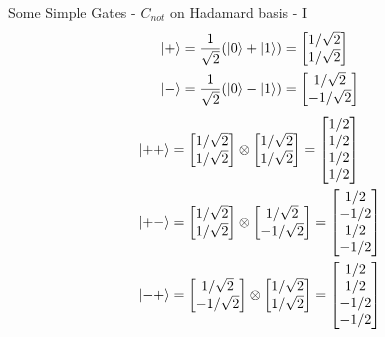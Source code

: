 \documentclass{beamer}
\begin{document}
\begin{frame}{Some Simple Gates - $C_{not}$ on Hadamard basis - I}
  {\tiny
    \begin{align*}
      \ket{+} &= \frac{1}{\sqrt{2}} (\ket{0} + \ket{1}) = \begin{bmatrix} 1 / \sqrt{2} \\ 1 / \sqrt{2} \end{bmatrix} \\
      \ket{-} &= \frac{1}{\sqrt{2}} (\ket{0} - \ket{1})  = \begin{bmatrix} 1 / \sqrt{2} \\ - 1 / \sqrt{2} \end{bmatrix} \\
    \end{align*}
    \begin{align*}
      \ket{++} &= \begin{bmatrix} 1 / \sqrt{2} \\ 1 / \sqrt{2}  \end{bmatrix} \otimes \begin{bmatrix} 1 / \sqrt{2} \\ 1 / \sqrt{2}  \end{bmatrix} = \begin{bmatrix}  1 / 2 \\ 1 / 2 \\ 1 / 2 \\ 1 / 2 \end{bmatrix} \\
      \ket{+-} &= \begin{bmatrix} 1 / \sqrt{2} \\ 1 / \sqrt{2}  \end{bmatrix} \otimes \begin{bmatrix} 1 / \sqrt{2} \\ - 1 / \sqrt{2} \end{bmatrix} = \begin{bmatrix}  1 / 2 \\ -1 / 2 \\ 1 / 2 \\ - 1 / 2 \end{bmatrix} \\
      \ket{-+} &= \begin{bmatrix} 1 / \sqrt{2} \\ - 1 / \sqrt{2}  \end{bmatrix} \otimes \begin{bmatrix} 1 / \sqrt{2} \\  1 / \sqrt{2} \end{bmatrix} = \begin{bmatrix}  1 / 2 \\ 1 / 2 \\ - 1 / 2 \\ - 1 / 2 \end{bmatrix} \\

\end{align*}}
\end{frame}
\end{document}
